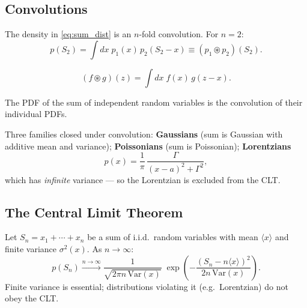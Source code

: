 \subsection{Convolutions}

The density in \eqref{eq:sum_dist} is an $n$-fold convolution. For $n=2$:
\begin{equation}
    p(S_2) = \int dx\; p_1(x)\, p_2(S_2 - x) \equiv (p_1 \circledast p_2)(S_2).
\end{equation}

\begin{definition}[Convolution]
\begin{equation}
    (f \circledast g)(z) = \int dx\; f(x)\, g(z - x).
\end{equation}
\end{definition}

\begin{fact}
The PDF of the sum of independent random variables is the convolution of their individual PDFs.
\end{fact}

Three families closed under convolution: \textbf{Gaussians} (sum is Gaussian with additive mean and variance); \textbf{Poissonians} (sum is Poissonian); \textbf{Lorentzians}
\begin{equation}
    p(x) = \frac{1}{\pi}\,\frac{\Gamma}{(x-a)^2 + \Gamma^2},
\end{equation}
which has \emph{infinite} variance — so the Lorentzian is excluded from the CLT.

\subsection{The Central Limit Theorem}

\begin{theorem}
Let $S_n = x_1 + \cdots + x_n$ be a sum of i.i.d.\ random variables with mean $\langle x\rangle$ and finite variance $\sigma^2(x)$. As $n \to \infty$:
\begin{equation}
    p(S_n) \xrightarrow{n\to\infty} \frac{1}{\sqrt{2\pi n\,\mathrm{Var}(x)}}\;\exp\!\left(-\frac{(S_n - n\langle x\rangle)^2}{2n\,\mathrm{Var}(x)}\right).
\end{equation}
Finite variance is essential; distributions violating it (e.g.\ Lorentzian) do not obey the CLT.
\end{theorem}

